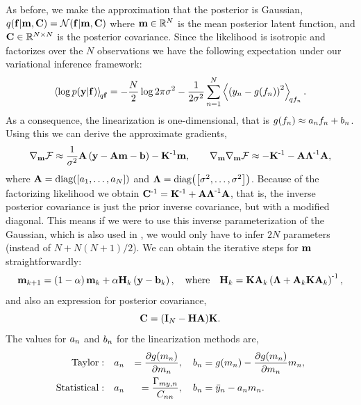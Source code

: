 \documentclass{article} %
\begin{document}
As before, we make the approximation that the posterior is Gaussian,
$\qrobC{\lstate}{\pomean, \pocov} = \gausC{\lstate}{\pomean, \pocov}$ where
$\pomean \in \real{N}$ is the mean posterior latent function, and $\pocov \in
\real{N \times N}$ is the posterior covariance. Since the likelihood is
isotropic and factorizes over the $N$  observations 
we have the following expectation under
our variational inference framework:
\begin{equation*}
    \expec{q\lstate}{\log\probC{\obs}{\lstate}} =
        - \frac{N}{2}\log{2\pi\lvar}
        - \frac{1}{2\lvar} \sum_{n=1}^N 
            \expec{q\lstates_n}{\brac{\obss_n - \nonlin{\lstates_n}}^2}.
\end{equation*}
As a consequence, the linearization is one-dimensional, that is
$\nonlin{\lstates_n} \approx \Lins_n\lstates_n + \intcpts_n$.  Using this we
can derive the approximate gradients,
\begin{equation}
    \nabla_\pomean\Fengy \approx \frac{1}{\lvar}\Linmat\brac{\obs -
        \Linmat\pomean - \intcpt} - \KERNL\inv\pomean,
    \qquad
    \nabla_\pomean\nabla_\pomean \Fengy \approx -\KERNL\inv
    -\Linmat\Lvar\inv\Linmat,
\end{equation}
where $\Linmat = \diag{\sbrac{\Lins_1, \ldots, \Lins_N}}$ and $\Lvar =
\diag{\sbrac{\lvar, \ldots, \lvar}}$. Because of the factorizing likelihood we
obtain $\pocov\inv = \KERNL\inv + \Linmat\Lvar\inv\Linmat$, that is, the
inverse posterior covariance is just the prior inverse covariance, but with a
modified diagonal. This means if we were to use this inverse parameterization
of the Gaussian, which is also used in \cite{Opper2009}, we would only have to
infer $2N$ parameters (instead of $N + N(N+1)/2$). We can obtain the iterative
steps for $\pomean$ straightforwardly:
\begin{equation}
    \pomean_{k+1} = \brac{1-\step}\pomean_k 
        + \step\Kgain_k\brac{\obs - \intcpt_k}, 
        \quad \text{where} \quad
    \Kgain_k = \KERNL\Linmat_k\brac{\Lvar + \Linmat_k\KERNL\Linmat_k}\inv,
    \label{eq:pomeangp}
\end{equation}
and also an expression for posterior covariance,
\begin{equation}
    \pocov = \brac{\ident{N} - \Kgain\Linmat}\!\KERNL.
    \label{eq:pocovgp}
\end{equation}
The values for $\Lins_n$ and $\intcpts_n$ for the linearization methods are,
\begin{alignat}{3}
    \text{Taylor}:&\quad
        \Lins_n &= \frac{\partial\nonlin{\pomeans_n}}{\partial\pomeans_n},
        \quad
        \intcpts_n &= \nonlin{\pomeans_n}
        - \frac{\partial\nonlin{\pomeans_n}}{\partial\pomeans_n} \pomeans_n, \\
    \text{Statistical}:&\quad
        \Lins_n &= \frac{\xcovs_{\pomeans\obss,n}}{\pocovs_{nn}},
        \quad
        \intcpts_n &= \bar\obss_n - \Lins_n\pomeans_n.
\end{alignat}
\end{document}
